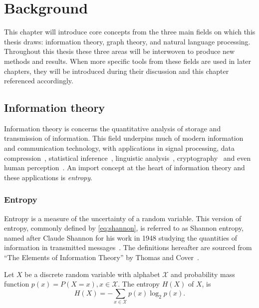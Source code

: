 \chapter{Background}\label{ch:background}

This chapter will introduce core concepts from the three main fields on which this thesis draws: information theory, graph theory, and natural language processing. Throughout this thesis these three areas will be interwoven to produce new methods and results. When more specific tools from these fields are used in later chapters, they will be introduced during their discussion and this chapter referenced accordingly.

\section{Information theory}
Information theory is concerns the quantitative analysis of storage and transmission of information. This field underpins much of modern information and communication technology, with applications in signal processing, data compression~\cite{schurmann1996entropy, bell1989modeling}, statistical inference~\cite{burnham_model_2002}, linguistic analysis~\cite{collobert2011natural,greenbergUniversalsLanguage1963}, cryptography~\cite{menezes2018handbook} and even human perception~\cite{delgado-bonal_human_2016}. An import concept at the heart of information theory and these applications is \emph{entropy}.

\subsection{Entropy}
Entropy is a measure of the uncertainty of a random variable. This version of entropy, commonly defined by \autoref{eq:shannon}, is referred to as Shannon entropy, named after Claude Shannon for his work in 1948 studying the quantities of information in transmitted messages~\cite{shannon_mathematical_1948}. The definitions hereafter are sourced from ``The Elements of Information Theory'' by Thomas and Cover~\cite{cover_elements_2012}.

\begin{definition}
	Let $X$ be a discrete random variable with alphabet $\mathcal{X}$ and probability mass function $p(x) = P(X = x), x \in \mathcal{X}$.
	The entropy $H(X)$ of $X$, is 
	\begin{equation}\label{eq:shannon}
	H(X)=-\sum_{x \in \mathcal{X}} p(x) \log_2 p(x).
	\end{equation}
\end{definition} 

